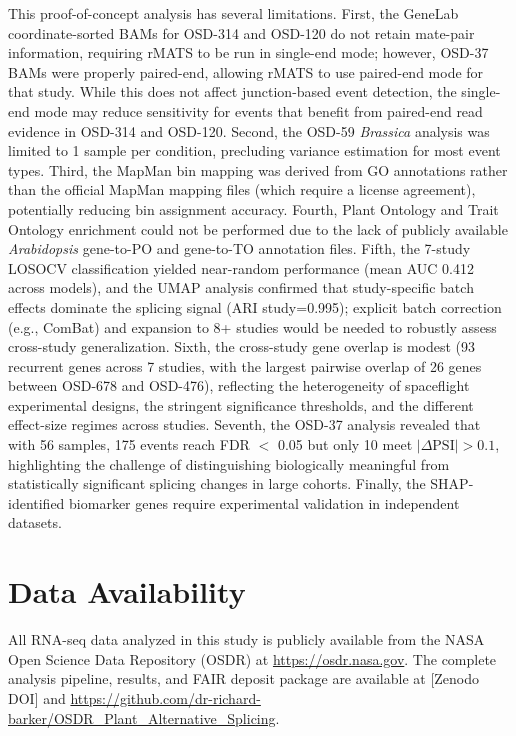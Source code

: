 \documentclass[12pt,a4paper]{article}
\begin{document}
This proof-of-concept analysis has several limitations. First, the GeneLab coordinate-sorted BAMs for OSD-314 and OSD-120 do not retain mate-pair information, requiring rMATS to be run in single-end mode; however, OSD-37 BAMs were properly paired-end, allowing rMATS to use paired-end mode for that study. While this does not affect junction-based event detection, the single-end mode may reduce sensitivity for events that benefit from paired-end read evidence in OSD-314 and OSD-120. Second, the OSD-59 \textit{Brassica} analysis was limited to 1 sample per condition, precluding variance estimation for most event types. Third, the MapMan bin mapping was derived from GO annotations rather than the official MapMan mapping files (which require a license agreement), potentially reducing bin assignment accuracy. Fourth, Plant Ontology and Trait Ontology enrichment could not be performed due to the lack of publicly available \textit{Arabidopsis} gene-to-PO and gene-to-TO annotation files. Fifth, the 7-study LOSOCV classification yielded near-random performance (mean AUC 0.412 across models), and the UMAP analysis confirmed that study-specific batch effects dominate the splicing signal (ARI study=0.995); explicit batch correction (e.g., ComBat) and expansion to 8+ studies would be needed to robustly assess cross-study generalization. Sixth, the cross-study gene overlap is modest (93 recurrent genes across 7 studies, with the largest pairwise overlap of 26 genes between OSD-678 and OSD-476), reflecting the heterogeneity of spaceflight experimental designs, the stringent significance thresholds, and the different effect-size regimes across studies. Seventh, the OSD-37 analysis revealed that with 56 samples, 175 events reach FDR $<$ 0.05 but only 10 meet $|\Delta\text{PSI}| > 0.1$, highlighting the challenge of distinguishing biologically meaningful from statistically significant splicing changes in large cohorts. Finally, the SHAP-identified biomarker genes require experimental validation in independent datasets.

\section{Data Availability}

All RNA-seq data analyzed in this study is publicly available from the NASA Open Science Data Repository (OSDR) at \url{https://osdr.nasa.gov}. The complete analysis pipeline, results, and FAIR deposit package are available at [Zenodo DOI] and \url{https://github.com/dr-richard-barker/OSDR_Plant_Alternative_Splicing}.
\end{document}
